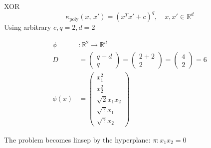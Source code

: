 \begin{exercise}{XOR}{}
	\begin{equation*}
		\kappa_{\text{poly}}(x,\,x') = \left( x^Tx'+c \right)^q,\quad x,x'\in\mathbb{R}^d
	\end{equation*}
	Using arbitrary $c,q=2,d=2$

	\begin{align*}
		\phi    & : \mathds R^2  \to \mathds R^d                      \\
		D       & = \begin{pmatrix}
			            q + d \\
			            q
		            \end{pmatrix} = \begin{pmatrix}
			                            2+2 \\
			                            2
		                            \end{pmatrix} = \begin{pmatrix}
			                                            4 \\
			                                            2
		                                            \end{pmatrix} = 6 \\
		\phi(x) & = \begin{pmatrix}
			            x_1^2          \\
			            x_2^2          \\
			            \sqrt{2}x_1x_2 \\
			            \sqrt{?}x_1    \\
			            \sqrt{?}x_2
		            \end{pmatrix}
	\end{align*}

	\begin{figure}[H]
	\end{figure}

	\begin{hint}
		The problem becomes linsep by the hyperplane:
		$\pi: x_1x_2=0$
	\end{hint}
\end{exercise}

